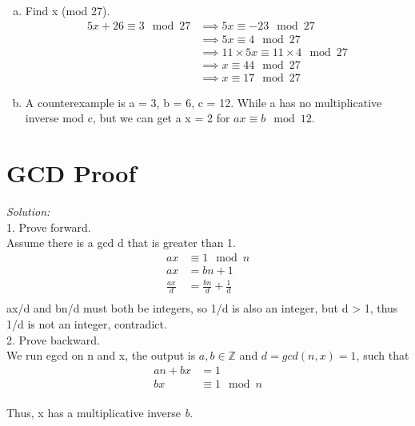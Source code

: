 \documentclass{article}
\begin{document}
\begin{enumerate}[(a).]
\begin{enumerate}[(a).]
    \item Find x (mod 27).\\
    \begin{align*}
        5x + 26 \equiv 3 \mod{27} &\implies 5x \equiv -23 \mod{27}\\
        &\implies 5x \equiv 4 \mod{27}\\
        &\implies 11 \times 5x \equiv 11 \times 4 \mod{27}\\
        &\implies x \equiv 44 \mod{27}\\
        &\implies x \equiv 17 \mod{27}
    \end{align*}

    \item A counterexample is a = 3, b = 6, c = 12. While a has no multiplicative inverse mod c, 
    but we can get a x = 2 for $ax \equiv b \mod{12}$.
\end{enumerate}

\part*{GCD Proof}

\emph{Solution:} \\
1. Prove forward.\\
Assume there is a gcd d that is greater than 1.\\
\begin{align*}
    ax &\equiv 1 \mod{n}\\
    ax &= bn + 1\\
    \frac{ax}{d} &= \frac{bn}{d} + \frac{1}{d}\\
\end{align*}
ax/d and bn/d must both be integers, so 1/d is also an integer, but d > 1, thus 1/d is not an integer, contradict. 
\\

2. Prove backward.\\
We run egcd on n and x, the output is $a,b \in \mathbb{Z}$ and $d = gcd(n,x) = 1$, such that 
\begin{align*}
    an + bx &= 1\\
    bx &\equiv 1 \mod{n}
\end{align*}
\\Thus, x has a multiplicative inverse \emph{b}.





\end{enumerate}
\end{document}
